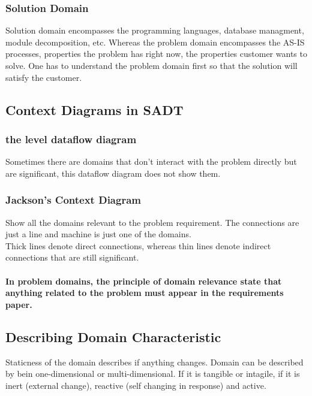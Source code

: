 \documentclass[11pt,a4paper,twocolumn]{book}
\begin{document}
\subsubsection{Solution Domain}

Solution domain encompasses the programming languages, database managment, module decomposition, etc. Whereas the problem domain encompasses the AS-IS processes, properties the problem has right now, the properties customer wants to solve. One has to understand the problem domain first so that the solution will satisfy the customer.

\subsection{Context Diagrams in SADT}

\subsubsection{the level dataflow diagram}

Sometimes there are domains that don't interact with the problem directly but are significant, this dataflow diagram does not show them.

\subsubsection{Jackson's Context Diagram}

Show all the domains relevant to the problem requirement. The connections are just a line and machine is just one of the domains.\\

Thick lines denote direct connections, whereas thin lines denote indirect connections that are still significant.

\paragraph{In problem domains, the principle of domain relevance state that anything related to the problem must appear in the requirements paper.}

\subsection{Describing Domain Characteristic}

Staticness of the domain describes if anything changes. Domain can be described by bein one-dimensional or multi-dimensional. If it is tangible or intagile, if it is inert (external change), reactive (self changing in response) and active.
\end{document}
